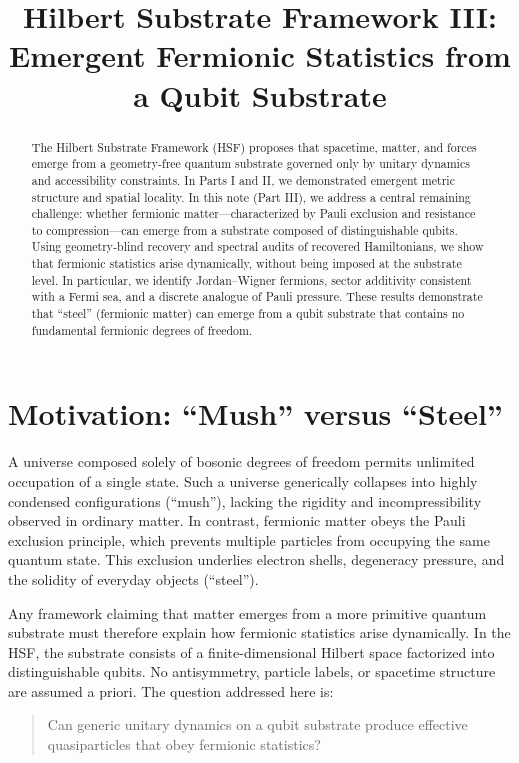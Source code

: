 \documentclass[11pt]{article}
\title{Hilbert Substrate Framework III:\\
Emergent Fermionic Statistics from a Qubit Substrate}
\author{ }
\date{ }
\begin{document}
\maketitle

\begin{abstract}
The Hilbert Substrate Framework (HSF) proposes that spacetime, matter, and forces emerge from a geometry-free quantum substrate governed only by unitary dynamics and accessibility constraints. In Parts I and II, we demonstrated emergent metric structure and spatial locality. In this note (Part III), we address a central remaining challenge: whether fermionic matter---characterized by Pauli exclusion and resistance to compression---can emerge from a substrate composed of distinguishable qubits. Using geometry-blind recovery and spectral audits of recovered Hamiltonians, we show that fermionic statistics arise dynamically, without being imposed at the substrate level. In particular, we identify Jordan--Wigner fermions, sector additivity consistent with a Fermi sea, and a discrete analogue of Pauli pressure. These results demonstrate that ``steel'' (fermionic matter) can emerge from a qubit substrate that contains no fundamental fermionic degrees of freedom.
\end{abstract}

\section{Motivation: ``Mush'' versus ``Steel''}

A universe composed solely of bosonic degrees of freedom permits unlimited occupation of a single state. Such a universe generically collapses into highly condensed configurations (``mush''), lacking the rigidity and incompressibility observed in ordinary matter. In contrast, fermionic matter obeys the Pauli exclusion principle, which prevents multiple particles from occupying the same quantum state. This exclusion underlies electron shells, degeneracy pressure, and the solidity of everyday objects (``steel'').

Any framework claiming that matter emerges from a more primitive quantum substrate must therefore explain how fermionic statistics arise dynamically. In the HSF, the substrate consists of a finite-dimensional Hilbert space factorized into distinguishable qubits. No antisymmetry, particle labels, or spacetime structure are assumed a priori. The question addressed here is:

\begin{quote}
Can generic unitary dynamics on a qubit substrate produce effective quasiparticles that obey fermionic statistics?
\end{quote}
\end{document}
